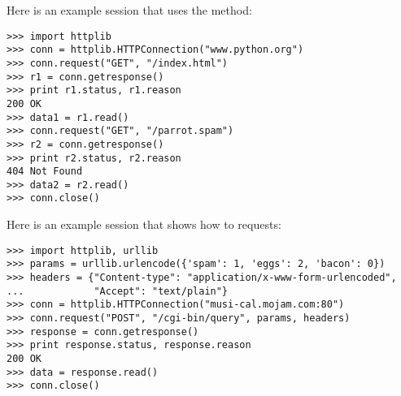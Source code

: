 Here is an example session that uses the  method:

\begin{verbatim}
>>> import httplib
>>> conn = httplib.HTTPConnection("www.python.org")
>>> conn.request("GET", "/index.html")
>>> r1 = conn.getresponse()
>>> print r1.status, r1.reason
200 OK
>>> data1 = r1.read()
>>> conn.request("GET", "/parrot.spam")
>>> r2 = conn.getresponse()
>>> print r2.status, r2.reason
404 Not Found
>>> data2 = r2.read()
>>> conn.close()
\end{verbatim}

Here is an example session that shows how to  requests:

\begin{verbatim}
>>> import httplib, urllib
>>> params = urllib.urlencode({'spam': 1, 'eggs': 2, 'bacon': 0})
>>> headers = {"Content-type": "application/x-www-form-urlencoded",
...            "Accept": "text/plain"}
>>> conn = httplib.HTTPConnection("musi-cal.mojam.com:80")
>>> conn.request("POST", "/cgi-bin/query", params, headers)
>>> response = conn.getresponse()
>>> print response.status, response.reason
200 OK
>>> data = response.read()
>>> conn.close()
\end{verbatim}
